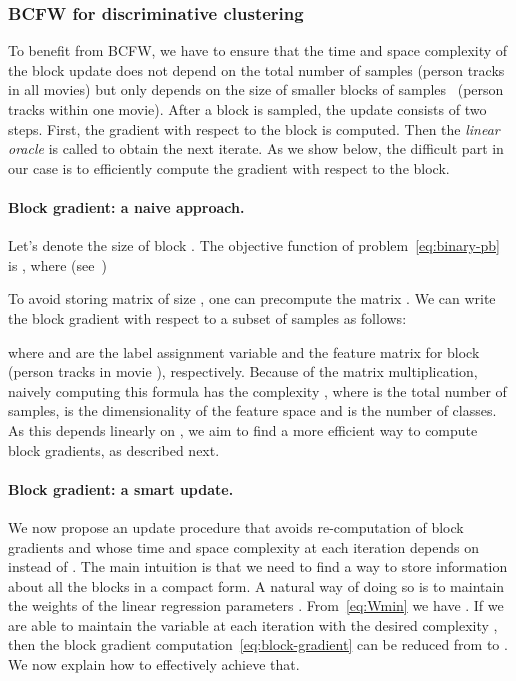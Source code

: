 \documentclass[10pt,twocolumn,letterpaper]{article}
\begin{document}
\subsubsection{BCFW for discriminative clustering}
\label{sec:BCFW_DIFFRAC}
To benefit from BCFW, we have to ensure that the time and space complexity of the block update does not depend on the total number of samples  (\eg person tracks in all movies) but only depends on the size  of smaller blocks of samples~ (\eg person tracks within one movie).
After a block is sampled, the update consists of two steps.
First, the gradient with respect to the block is computed. 
Then the \emph{linear oracle} is called to obtain the next iterate.
As we show below, the difficult part in our case is to efficiently compute the gradient with respect to the block.

\paragraph{Block gradient: a naive approach.} \label{block-gradient}
Let's denote  the size of block .
The objective function  of problem~\eqref{eq:binary-pb} is , where (see~\cite{bach07diffrac})

To avoid storing matrix  of size , one can precompute the matrix .
We can write the block gradient with respect to a subset of samples  as follows:

where  and  are the label assignment variable and the feature matrix for block  (\eg person tracks in movie ), respectively.
Because of the  matrix multiplication, naively computing this formula has the complexity , where  is the total number of samples,  is the dimensionality of the feature space and  is the number of classes.
As this depends linearly on , we aim to find a more efficient way to compute block gradients, as described next.

\paragraph{Block gradient: a smart update.} 
We now propose an update procedure that avoids re-computation of block gradients and whose time and space complexity at each iteration depends on  instead of .
The main intuition is that we need to find a way to store information about all the blocks in a compact form.
A natural way of doing so is to maintain the weights of the linear regression parameters .
From~\eqref{eq:Wmin} we have .
If we are able to maintain the variable  at each iteration with the desired complexity , then the block gradient computation~\eqref{eq:block-gradient} can be reduced from  to .
We now explain how to effectively achieve that.
\end{document}
